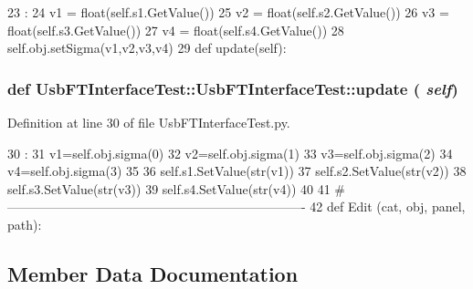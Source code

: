 \begin{DoxyCode}
23                             :
24         v1 = float(self.s1.GetValue())
25         v2 = float(self.s2.GetValue())
26         v3 = float(self.s3.GetValue())
27         v4 = float(self.s4.GetValue())
28         self.obj.setSigma(v1,v2,v3,v4)
29 
    def update(self):
\end{DoxyCode}
\hypertarget{classUsbFTInterfaceTest_1_1UsbFTInterfaceTest_a7552f5470ad7457b47e4a71d82852721}{
\subsubsection[{update}]{\setlength{\rightskip}{0pt plus 5cm}def UsbFTInterfaceTest::UsbFTInterfaceTest::update ( {\em self})}}
\label{classUsbFTInterfaceTest_1_1UsbFTInterfaceTest_a7552f5470ad7457b47e4a71d82852721}


Definition at line 30 of file UsbFTInterfaceTest.py.


\begin{DoxyCode}
30                     :
31         v1=self.obj.sigma(0)
32         v2=self.obj.sigma(1)
33         v3=self.obj.sigma(2)
34         v4=self.obj.sigma(3)
35 
36         self.s1.SetValue(str(v1))
37         self.s2.SetValue(str(v2))
38         self.s3.SetValue(str(v3))
39         self.s4.SetValue(str(v4))        
40 
41 #----------------------------------------------------------------------
42 
def Edit (cat, obj, panel, path):
\end{DoxyCode}


\subsection{Member Data Documentation}
\hypertarget{classUsbFTInterfaceTest_1_1UsbFTInterfaceTest_ac4b7f2371d7d8e4385d432f77374005f}{
\subsubsection[{s1}]{}}
\label{classUsbFTInterfaceTest_1_1UsbFTInterfaceTest_ac4b7f2371d7d8e4385d432f77374005f}


